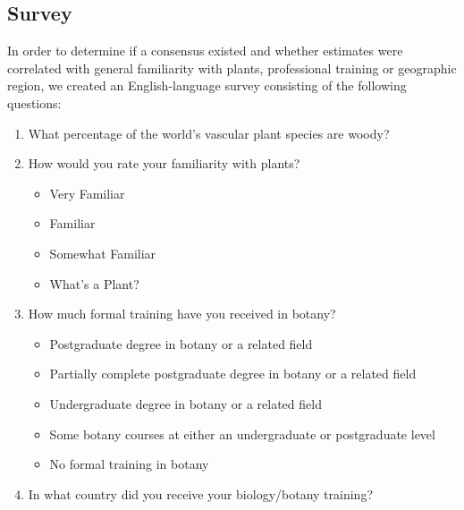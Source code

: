 \documentclass[12pt]{article}
\begin{document}
\subsection{Survey}
In order to determine if a consensus existed and whether estimates were correlated with general familiarity with plants, professional training or geographic region, we created an English-language survey consisting of the following questions:

\begin{enumerate}

\item What percentage of the world's vascular plant species are woody?

\item How would you rate your familiarity with plants?

	\begin{itemize}
	
		\item Very Familiar
	
		\item Familiar
	
		\item Somewhat Familiar
	
		\item What's a Plant?
	
	\end{itemize}
	
\item How much formal training have you received in botany?

	\begin{itemize}
	
		\item Postgraduate degree in botany or a related field
		
		\item Partially complete postgraduate degree in botany or a related field
		
		\item Undergraduate degree in botany or a related field
		
		\item Some botany courses at either an undergraduate or postgraduate level
		
		\item No formal training in botany
		
	\end{itemize}
	
\item In what country did you receive your biology/botany training?

\end{enumerate}
\end{document}
